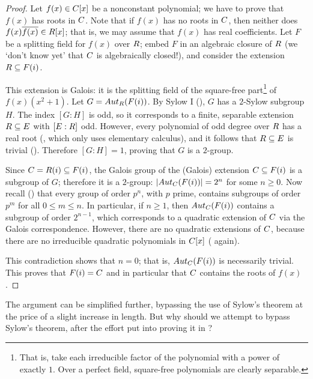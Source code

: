 \begin{proof}
  Let $f(x) \in C[x]$ be a nonconstant polynomial; we have to prove
  that $f(x)$ has roots in $C$. Note that if $f(x)$ has no roots in
  $C$, then neither does $f(x)\overline{f(x)} \in R[x]$; that is, we
  may assume that $f(x)$ has real coefficients. Let $F$ be a splitting
  field for $f(x)$ over $R$; embed $F$ in an algebraic closure of
  $R$ (we `don't know yet' that $C$ is algebraically closed!), and
  consider the extension $R \subseteq F(i)$.

  This extension is Galois: it is the splitting field of the
  square-free part\footnote{That is, take each irreducible factor of
    the polynomial with a power of exactly $1$. Over a perfect field,
    square-free polynomials are clearly separable.} of
  $f(x)(x^2 + 1)$.  Let $G = Aut_{R}(F(i))$.  By Sylow I
  (), $G$ has a $2$-Sylow subgroup $H$. The
  index $[G : H]$ is odd, so it corresponds to a finite, separable
  extension $R \subseteq E$ with $[E : R]$ odd. However, every
  polynomial of odd degree over $R$ has a real root
  (, which only
  uses elementary calculus), and it follows that $R \subseteq E$ is
  trivial
  (). Therefore
  $[G : H] = 1$, proving that $G$ is a $2$-group.

  Since $C = R(i) \subseteq F(i)$, the Galois group of the (Galois)
  extension $C \subseteq F(i)$ is a subgroup of $G$; therefore it is
  a $2$-group: $|Aut_{C}(F(i))| = 2^n$ for some $n \geq 0$. Now
  recall () that every group of
  order $p^n$, with $p$ prime, contains subgroups of order $p^m$ for
  all $0 \leq m \leq n$. In particular, if $n \geq 1$, then
  $Aut_{C}(F(i))$ contains a subgroup of order $2^{n-1}$, which
  corresponds to a quadratic extension of $C$ via the Galois
  correspondence. However, there are no quadratic extensions of $C$,
  because there are no irreducible quadratic polynomials in $C[x]$
  (
  again).

  This contradiction shows that $n = 0$; that is, $Aut_{C}(F(i))$ is
  necessarily trivial. This proves that $F(i) = C$ and in particular
  that $C$ contains the roots of $f(x)$.
\end{proof}
The argument can be simplified further, bypassing the use of Sylow's
theorem at the price of a slight increase in length. But why should we
attempt to bypass Sylow's theorem, after the effort put into proving
it in ?

